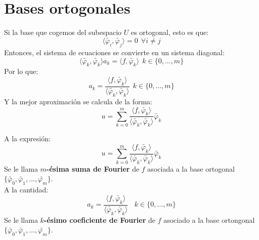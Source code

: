 \section{Bases ortogonales}
\noindent
Si la base que cogemos del subespacio $U$ es ortogonal, esto es que:
$$\langle \tilde{\varphi_i}, \tilde{\varphi_j} \rangle = 0 ~~\forall i\neq j$$
Entonces, el sistema de ecuaciones se convierte en un sistema diagonal:
$$\langle \tilde{\varphi_k}, \tilde{\varphi_k} \rangle a_k = \langle f, \tilde{\varphi_k} \rangle~~k \in \{0, \ldots, m\}$$
Por lo que:
$$a_k = \dfrac{\langle f, \tilde{\varphi_k} \rangle}{\langle \tilde{\varphi_k}, \tilde{\varphi_k} \rangle}~~k \in \{0, \ldots, m\}$$
Y la mejor aproximación se calcula de la forma:
$$u = \sum_{k=0}^m \dfrac{\langle f, \tilde{\varphi_k} \rangle}{\langle \tilde{\varphi_k}, \tilde{\varphi_k} \rangle}\tilde{\varphi_k}$$

\bigskip
\begin{definicion}
    A la expresión:
    $$u = \sum_{k=0}^m \dfrac{\langle f, \tilde{\varphi_k} \rangle}{\langle \tilde{\varphi_k}, \tilde{\varphi_k} \rangle}\tilde{\varphi_k}$$
    Se le llama \textbf{$m$-ésima suma de Fourier} de $f$ asociada a la base ortogonal $\{\tilde{\varphi_0}, \tilde{\varphi_1},
        \ldots, \tilde{\varphi_m}\}$.\\

    \noindent
    A la cantidad:
    $$a_k = \dfrac{\langle f, \tilde{\varphi_k} \rangle}{\langle \tilde{\varphi_k}, \tilde{\varphi_k} \rangle}~~~~k \in \{0, \ldots, m\}$$
    Se le llama \textbf{$k$-ésimo coeficiente de Fourier} de $f$ asociado a la base ortongonal $\{\tilde{\varphi_0}, \tilde{\varphi_1},
        \ldots, \tilde{\varphi_m}\}$.\\
\end{definicion}

